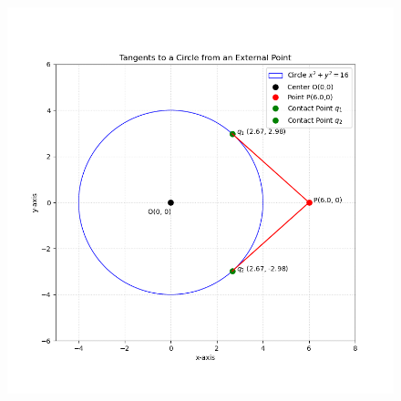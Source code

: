 \documentclass[article]{IEEEtran}
\begin{document}
	\begin{figure}[H]
		\centering
		\includegraphics[width=1.1\linewidth]{figs/tangents_plot}
	\end{figure}
	
\end{document}
